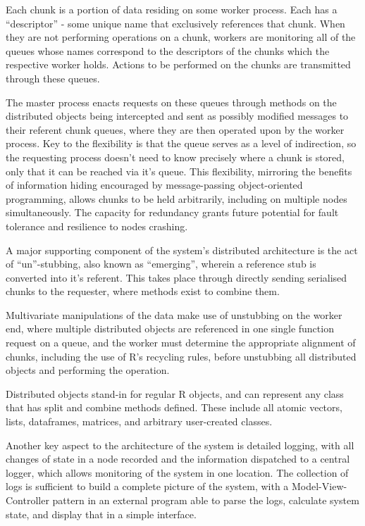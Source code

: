 \documentclass[a4paper,10pt]{article}
\begin{document}
Each chunk is a portion of data residing on some worker process.
Each has a ``descriptor'' - some unique name that exclusively references that chunk.
When they are not performing operations on a chunk, workers are monitoring all of the queues whose names correspond to the descriptors of the chunks which the respective worker holds.
Actions to be performed on the chunks are transmitted through these queues.

The master process enacts requests on these queues through methods on the distributed objects being intercepted and sent as possibly modified messages to their referent chunk queues, where they are then operated upon by the worker process.
Key to the flexibility is that the queue serves as a level of indirection, so the requesting process doesn't need to know precisely where a chunk is stored, only that it can be reached via it's queue.
This flexibility, mirroring the benefits of information hiding encouraged by message-passing object-oriented programming, allows chunks to be held arbitrarily, including on multiple nodes simultaneously.
The capacity for redundancy grants future potential for fault tolerance and resilience to nodes crashing.

A major supporting component of the system's distributed architecture is the act of ``un''-stubbing, also known as ``emerging'', wherein a reference stub is converted into it's referent.
This takes place through directly sending serialised chunks to the requester, where methods exist to combine them.

Multivariate manipulations of the data make use of unstubbing on the worker end, where multiple distributed objects are referenced in one single function request on a queue, and the worker must determine the appropriate alignment of chunks, including the use of R's recycling rules, before unstubbing all distributed objects and performing the operation.

Distributed objects stand-in for regular R objects, and can represent any class that has split and combine methods defined.
These include all atomic vectors, lists, dataframes, matrices, and arbitrary user-created classes.

Another key aspect to the architecture of the system is detailed logging, with all changes of state in a node recorded and the information dispatched to a central logger, which allows monitoring of the system in one location. The collection of logs is sufficient to build a complete picture of the system, with a Model-View-Controller pattern in an external program able to parse the logs, calculate system state, and display that in a simple interface.
\end{document}
